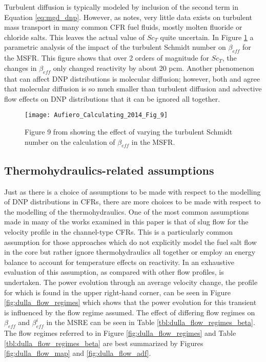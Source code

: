 \documentclass[review]{elsarticle}
\begin{document}
Turbulent diffusion is typically modeled by inclusion of the second term in
Equation \ref{eq:mgd_dnp}. However, as \cite{aufiero_calculating_2014} notes,
very little data exists on turbulent mass transport in many common
CFR fuel fluids, mostly molten fluoride or chloride salts. This leaves the
actual value of $Sc_{T}$ quite uncertain. In Figure \ref{fig:aufiero_sc}
\cite{aufiero_calculating_2014} a parametric analysis of the impact of the
turbulent Schmidt number on $\beta_{eff}$ for the MSFR. This
figure shows that over 2 orders of magnitude for $Sc_{T}$, the changes in
$\beta_{eff}$ only
changed reactivity by about 20 pcm.
Another phenomenon that can affect DNP distributions
is molecular diffusion; however, both \cite{aufiero_calculating_2014} and
\cite{cheng_development_2014} agree that molecular diffusion is so much smaller
than turbulent diffusion and advective flow effects on DNP distributions that it
can be ignored all together.

\begin{figure}[H]
   \centering
   \texttt{[image: Aufiero\_Calculating\_2014\_Fig\_9]}
   \caption{Figure 9 from \cite{aufiero_calculating_2014} showing the effect of varying
   the turbulent Schmidt number on the calculation of $\beta_{eff}$ in the MSFR.}
   \label{fig:aufiero_sc}
\end{figure}

\subsection{Thermohydraulics-related assumptions} \label{th_asm}
Just as there is a choice of assumptions to be made with respect to the
modelling of DNP distributions in CFRs, there are more choices to be
made with respect to the modelling of the thermohydraulics. One of the most
common assumptions made in many of the works examined in this paper is that
of slug flow for the velocity profile in the channel-type CFRs. This is a
particularly common assumption for those approaches which do not explicitly
model the fuel salt flow in the core but rather ignore thermohydraulics
all together or employ an energy balance to account for temperature effects
on reactivity. In \cite{dulla_interactions_2007} an exhaustive evaluation
of this assumption, as compared with other flow profiles, is undertaken.
The power evolution through an average velocity change, the profile for which
is found
in the upper right-hand corner, can be seen in Figure 
\ref{fig:dulla_flow_regimes}
which shows that the power evolution for this transient is 
influenced by the flow regime assumed. The effect of differing flow regimes
on $\beta_{eff}$ and $\beta_{eff}^{i}$ in the MSRE can be seen in Table
\ref{tbl:dulla_flow_regimes_beta}. The flow regimes referred to in Figure
\ref{fig:dulla_flow_regimes} and Table \ref{tbl:dulla_flow_regimes_beta} are
best 
summarized by Figures \ref{fig:dulla_flow_map} and \ref{fig:dulla_flow_adf}.
\end{document}
